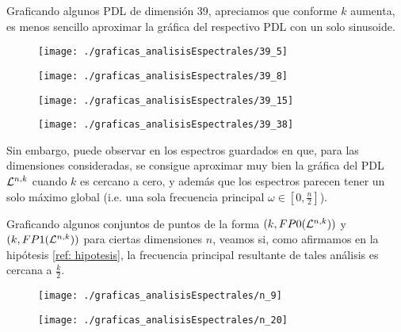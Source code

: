 Graficando algunos PDL de dimensión
39, apreciamos que conforme $k$ aumenta, es menos
sencillo aproximar la gráfica del respectivo PDL
con un solo sinusoide.
\begin{figure}[H]
	\centering
	\texttt{[image: ./graficas\_analisisEspectrales/39\_5]} 
\end{figure}	
\begin{figure}[H]
	\centering
	\texttt{[image: ./graficas\_analisisEspectrales/39\_8]} 
\end{figure}	
\begin{figure}[H]
	\centering
	\texttt{[image: ./graficas\_analisisEspectrales/39\_15]} 
\end{figure}	
\begin{figure}[H]
	\centering
	\texttt{[image: ./graficas\_analisisEspectrales/39\_38]} 
\end{figure}	

Sin embargo, puede observar en los espectros guardados en 
 que, para las dimensiones consideradas,
se consigue aproximar muy bien la gráfica del PDL
$\mathcal{L}^{n,k}$ cuando $k$ es cercano a cero, y además 
que los espectros parecen tener un solo máximo global
(i.e. una sola frecuencia principal 
$\omega \in \left[0, \frac{n}{2} \right]$).

Graficando algunos conjuntos de puntos
de la forma
$(k, FP0(\mathcal{L}^{n,k}))$ y 
$(k, FP1(\mathcal{L}^{n,k}))$ para ciertas
dimensiones $n$, veamos si, como 
afirmamos en la hipótesis 
\ref{ref: hipotesis}, la frecuencia principal
resultante de tales análisis es cercana
a $\frac{k}{2}$.

\begin{figure}[H]
	\centering
	\texttt{[image: ./graficas\_analisisEspectrales/n\_9]} 
\end{figure}	

\begin{figure}[H]
	\centering
	\texttt{[image: ./graficas\_analisisEspectrales/n\_20]} 
\end{figure}

